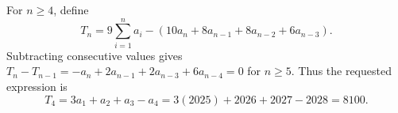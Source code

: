 For $n\ge4$, define
\[
T_n=9\sum_{i=1}^n a_i-(10a_n+8a_{n-1}+8a_{n-2}+6a_{n-3}).
\]
Subtracting consecutive values gives $T_n-T_{n-1}=-a_n+2a_{n-1}+2a_{n-3}+6a_{n-4}=0$ for $n\ge5$. Thus the requested expression is
\[
T_4=3a_1+a_2+a_3-a_4
=3(2025)+2026+2027-2028=\boxed{8100}.
\]
